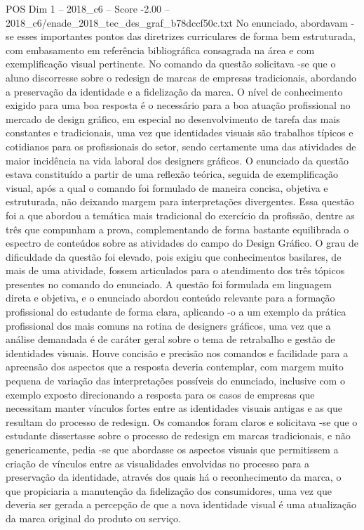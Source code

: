 \begin{textsample}{POS Dim 1 – 2018\_c6 – Score -2.00 – 2018\_c6/enade\_2018\_tec\_des\_graf\_b78dccf50c.txt}
No enunciado, abordavam -se esses importantes pontos das diretrizes curriculares de forma bem estruturada, com embasamento em referência bibliográfica consagrada na área e com exemplificação visual pertinente.
No comando da questão solicitava -se que o aluno discorresse sobre o redesign de marcas de empresas tradicionais, abordando a preservação da identidade e a fidelização da marca.
O nível de conhecimento exigido para uma boa resposta é o necessário para a boa atuação profissional no mercado de design gráfico, em especial no desenvolvimento de tarefa das mais constantes e tradicionais, uma vez que identidades visuais são trabalhos típicos e cotidianos para os profissionais do setor, sendo certamente uma das atividades de maior incidência na vida laboral dos designers gráficos.
O enunciado da questão estava constituído a partir de uma reflexão teórica, seguida de exemplificação visual, após a qual o comando foi formulado de maneira concisa, objetiva e estruturada, não deixando margem para interpretações divergentes.
Essa questão foi a que abordou a temática mais tradicional do exercício da profissão, dentre as três que compunham a prova, complementando de forma bastante equilibrada o espectro de conteúdos sobre as atividades do campo do Design Gráfico.
O grau de dificuldade da questão foi elevado, pois exigiu que conhecimentos basilares, de mais de uma atividade, fossem articulados para o atendimento dos três tópicos presentes no comando do enunciado.
A questão foi formulada em linguagem direta e objetiva, e o enunciado abordou conteúdo relevante para a formação profissional do estudante de forma clara, aplicando -o a um exemplo da prática profissional dos mais comuns na rotina de designers gráficos, uma vez que a análise demandada é de caráter geral sobre o tema de retrabalho e gestão de identidades visuais.
Houve concisão e precisão nos comandos e facilidade para a apreensão dos aspectos que a resposta deveria contemplar, com margem muito pequena de variação das interpretações possíveis do enunciado, inclusive com o exemplo exposto direcionando a resposta para os casos de empresas que necessitam manter vínculos fortes entre as identidades visuais antigas e as que resultam do processo de redesign.
Os comandos foram claros e solicitava -se que o estudante dissertasse sobre o processo de redesign em marcas tradicionais, e não genericamente, pedia -se que abordasse os aspectos visuais que permitissem a criação de vínculos entre as visualidades envolvidas no processo para a preservação da identidade, através dos quais há o reconhecimento da marca, o que propiciaria a manutenção da fidelização dos consumidores, uma vez que deveria ser gerada a percepção de que a nova identidade visual é uma atualização da marca original do produto ou serviço.

\end{textsample}
